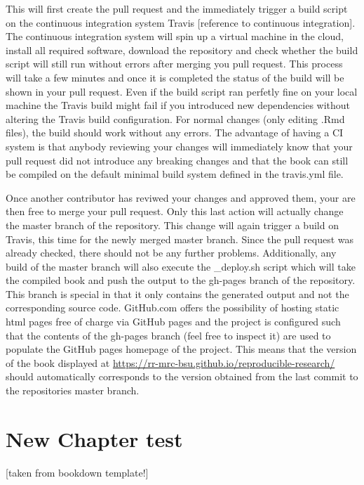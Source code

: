 \documentclass[]{book}
\begin{document}
This will first create the pull request and the immediately trigger a
build script on the continuous integration system Travis {[}reference to
continuous integration{]}. The continuous integration system will spin
up a virtual machine in the cloud, install all required software,
download the repository and check whether the build script will still
run without errors after merging you pull request. This process will
take a few minutes and once it is completed the status of the build will
be shown in your pull request. Even if the build script ran perfetly
fine on your local machine the Travis build might fail if you introduced
new dependencies without altering the Travis build configuration. For
normal changes (only editing .Rmd files), the build should work without
any errors. The advantage of having a CI system is that anybody
reviewing your changes will immediately know that your pull request did
not introduce any breaking changes and that the book can still be
compiled on the default minimal build system defined in the travis.yml
file.

Once another contributor has reviwed your changes and approved them,
your are then free to merge your pull request. Only this last action
will actually change the master branch of the repository. This change
will again trigger a build on Travis, this time for the newly merged
master branch. Since the pull request was already checked, there should
not be any further problems. Additionally, any build of the master
branch will also execute the \_deploy.sh script which will take the
compiled book and push the output to the gh-pages branch of the
repository. This branch is special in that it only contains the
generated output and not the corresponding source code. GitHub.com
offers the possibility of hosting static html pages free of charge via
GitHub pages and the project is configured such that the contents of the
gh-pages branch (feel free to inspect it) are used to populate the
GitHub pages homepage of the project. This means that the version of the
book displayed at
\url{https://rr-mrc-bsu.github.io/reproducible-research/} should
automatically corresponds to the version obtained from the last commit
to the repositories master branch.

\chapter{New Chapter test}\label{newchapter}

{[}taken from bookdown template!{]}
\end{document}
